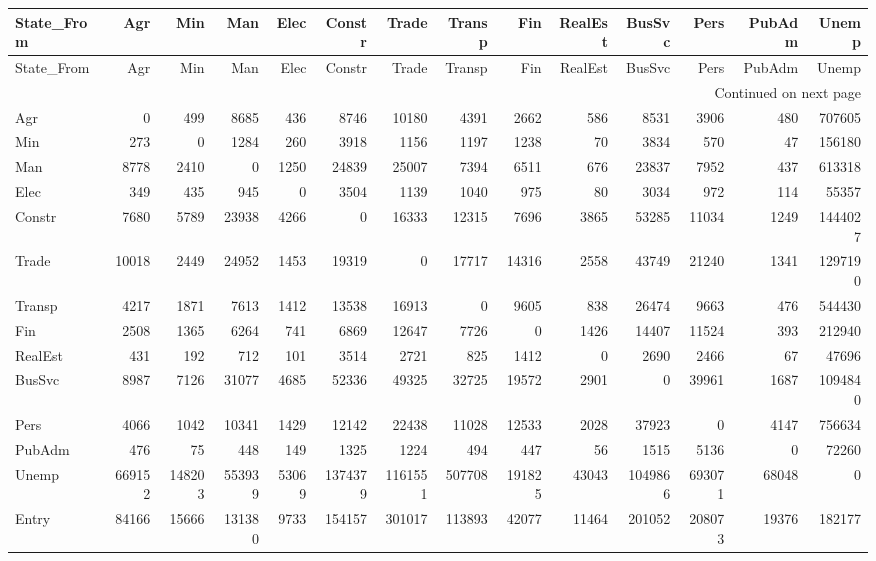 \begin{longtable}{lrrrrrrrrrrrrr}
\toprule
State_From & Agr & Min & Man & Elec & Constr & Trade & Transp & Fin & RealEst & BusSvc & Pers & PubAdm & Unemp \\
\midrule
\endfirsthead
\toprule
State_From & Agr & Min & Man & Elec & Constr & Trade & Transp & Fin & RealEst & BusSvc & Pers & PubAdm & Unemp \\
\midrule
\endhead
\midrule
\multicolumn{14}{r}{Continued on next page} \\
\midrule
\endfoot
\bottomrule
\endlastfoot
Agr & 0 & 499 & 8685 & 436 & 8746 & 10180 & 4391 & 2662 & 586 & 8531 & 3906 & 480 & 707605 \\
Min & 273 & 0 & 1284 & 260 & 3918 & 1156 & 1197 & 1238 & 70 & 3834 & 570 & 47 & 156180 \\
Man & 8778 & 2410 & 0 & 1250 & 24839 & 25007 & 7394 & 6511 & 676 & 23837 & 7952 & 437 & 613318 \\
Elec & 349 & 435 & 945 & 0 & 3504 & 1139 & 1040 & 975 & 80 & 3034 & 972 & 114 & 55357 \\
Constr & 7680 & 5789 & 23938 & 4266 & 0 & 16333 & 12315 & 7696 & 3865 & 53285 & 11034 & 1249 & 1444027 \\
Trade & 10018 & 2449 & 24952 & 1453 & 19319 & 0 & 17717 & 14316 & 2558 & 43749 & 21240 & 1341 & 1297190 \\
Transp & 4217 & 1871 & 7613 & 1412 & 13538 & 16913 & 0 & 9605 & 838 & 26474 & 9663 & 476 & 544430 \\
Fin & 2508 & 1365 & 6264 & 741 & 6869 & 12647 & 7726 & 0 & 1426 & 14407 & 11524 & 393 & 212940 \\
RealEst & 431 & 192 & 712 & 101 & 3514 & 2721 & 825 & 1412 & 0 & 2690 & 2466 & 67 & 47696 \\
BusSvc & 8987 & 7126 & 31077 & 4685 & 52336 & 49325 & 32725 & 19572 & 2901 & 0 & 39961 & 1687 & 1094840 \\
Pers & 4066 & 1042 & 10341 & 1429 & 12142 & 22438 & 11028 & 12533 & 2028 & 37923 & 0 & 4147 & 756634 \\
PubAdm & 476 & 75 & 448 & 149 & 1325 & 1224 & 494 & 447 & 56 & 1515 & 5136 & 0 & 72260 \\
Unemp & 669152 & 148203 & 553939 & 53069 & 1374379 & 1161551 & 507708 & 191825 & 43043 & 1049866 & 693071 & 68048 & 0 \\
Entry & 84166 & 15666 & 131380 & 9733 & 154157 & 301017 & 113893 & 42077 & 11464 & 201052 & 208073 & 19376 & 182177 \\
\end{longtable}
